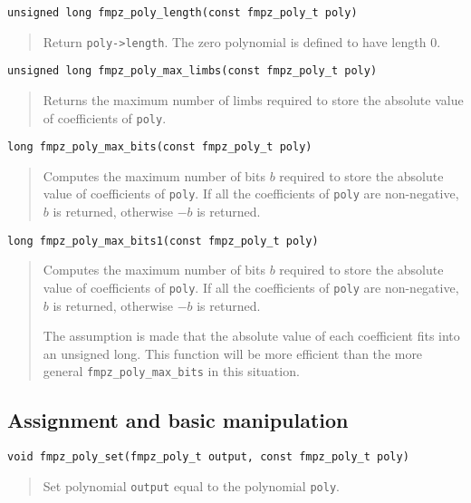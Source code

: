 \documentclass[a4paper,10pt]{article}
\newcommand{\code}{\lstinline}
\begin{document}
\begin{lstlisting}
unsigned long fmpz_poly_length(const fmpz_poly_t poly)
\end{lstlisting}
\begin{quote}
Return \code{poly->length}. The zero polynomial is defined to have length $0$.
\end{quote}

\begin{lstlisting}
unsigned long fmpz_poly_max_limbs(const fmpz_poly_t poly)
\end{lstlisting}
\begin{quote}
Returns the maximum number of limbs required to store the absolute value of coefficients of \code{poly}. \end{quote}

\begin{lstlisting}
long fmpz_poly_max_bits(const fmpz_poly_t poly)
\end{lstlisting}
\begin{quote}
Computes the maximum number of bits $b$ required to store the absolute value of coefficients of \code{poly}. If all the coefficients of \code{poly} are non-negative, $b$ is returned, otherwise $-b$ is returned. \end{quote}

\begin{lstlisting}
long fmpz_poly_max_bits1(const fmpz_poly_t poly)
\end{lstlisting}
\begin{quote}
Computes the maximum number of bits $b$ required to store the absolute value of coefficients of \code{poly}. If all the coefficients of \code{poly} are non-negative, $b$ is returned, otherwise $-b$ is returned. 

The assumption is made that the absolute value of each coefficient fits into an unsigned long. This function will be more efficient than the more general \code{fmpz_poly_max_bits} in this situation.
\end{quote}


\subsection{Assignment and basic manipulation}

\begin{lstlisting}
void fmpz_poly_set(fmpz_poly_t output, const fmpz_poly_t poly)
\end{lstlisting}
\begin{quote}
Set polynomial \code{output} equal to the polynomial \code{poly}.
\end{quote}
\end{document}
